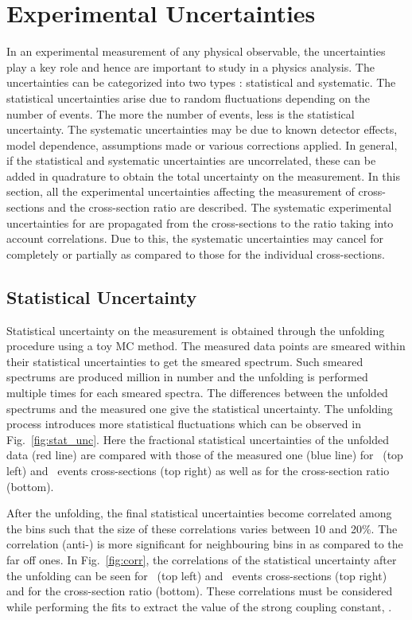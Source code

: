 \section{Experimental Uncertainties}
\label{sec:exp_unc}
In an experimental measurement of any physical observable, the uncertainties play a key role and hence are important to study in a physics analysis. The uncertainties can be categorized into two types : statistical and systematic. The statistical uncertainties arise due to random fluctuations depending on the number of events. The more the number of events, less is the statistical uncertainty. The systematic uncertainties may be due to known detector effects, model dependence, assumptions made or various corrections applied. In general, if the statistical and systematic uncertainties are uncorrelated, these can be added in quadrature to obtain the total uncertainty on the measurement. In this section, all the experimental uncertainties affecting the measurement of cross-sections and the cross-section ratio \ratio are described. The systematic experimental uncertainties for \ratio are propagated from the cross-sections to the ratio taking into account correlations. Due to this, the systematic uncertainties may cancel for \ratio completely or partially as compared to those for the individual cross-sections.

\subsection{Statistical Uncertainty}
\label{sec:unfolding_stat}
Statistical uncertainty on the measurement is obtained through the unfolding procedure using a toy MC method. The measured data points are smeared within their statistical uncertainties to get the smeared spectrum. Such smeared spectrums are produced million in number and the unfolding is performed multiple times for each smeared spectra. The differences between the unfolded spectrums and the measured one give the statistical uncertainty. The unfolding process introduces more statistical fluctuations which can be observed in Fig.~\ref{fig:stat_unc}. Here the fractional statistical uncertainties of the unfolded data (red line) are compared with those of the measured one (blue line) for \njt~(top left) and \njth~events cross-sections (top right) as well as for the cross-section ratio \ratio (bottom). 

After the unfolding, the final statistical uncertainties become correlated among the bins such that the size of these correlations varies between 10 and 20\%. The correlation (anti-) is more significant for neighbouring bins in \httwo as compared to the far off ones. In Fig.~\ref{fig:corr}, the correlations of the statistical uncertainty after the unfolding can be seen for \njt~(top left) and \njth~events cross-sections (top right) and for the cross-section ratio \ratio (bottom). These correlations must be considered while performing the fits to extract the value of the strong coupling constant, \alpsns. 


